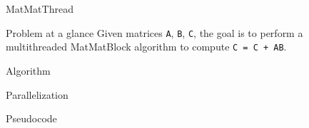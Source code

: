 \begin{chapter}{MatMatThread}
    \begin{section}{Problem at a glance}
        Given matrices \texttt{A}, \texttt{B}, \texttt{C}, the goal is to perform a multithreaded MatMatBlock algorithm to compute \texttt{C = C + AB}.
    \end{section}
    \begin{section}{Algorithm}
        \begin{subsection}{Parallelization}
        \end{subsection}
        \begin{subsection}{Pseudocode}

        \end{subsection}
    \end{section}
\end{chapter}